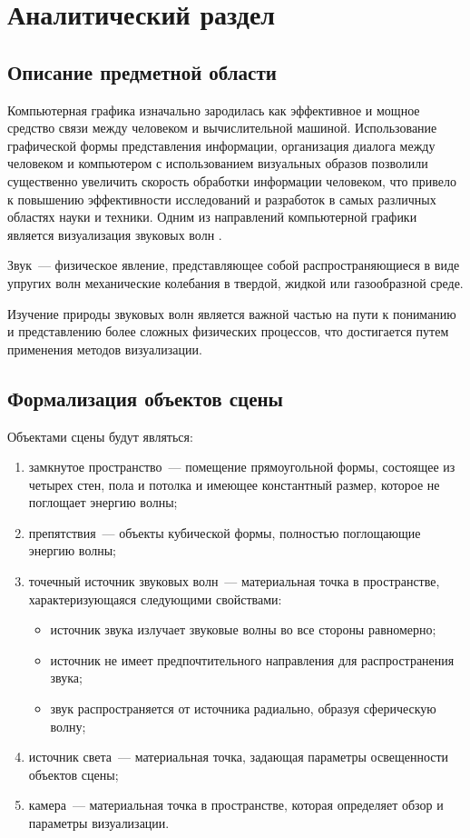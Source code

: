 \chapter{Аналитический раздел}

\section{Описание предметной области}

Компьютерная графика изначально зародилась как эффективное и мощное средство связи между человеком и вычислительной машиной.
Использование графической формы представления информации, организация диалога между человеком и компьютером с использованием визуальных образов позволили существенно увеличить скорость обработки информации человеком, что привело к повышению эффективности исследований и разработок в самых различных областях науки и техники.
Одним из направлений компьютерной графики является визуализация звуковых волн \cite{baseGraph1, baseGraph2}.

Звук~--- физическое явление, представляющее собой распространяющиеся в виде упругих волн механические колебания в твердой, жидкой или газообразной среде.

Изучение природы звуковых волн является важной частью на пути к пониманию и представлению более сложных физических процессов, что достигается путем применения методов визуализации.

\clearpage

\section{Формализация объектов сцены}

Объектами сцены будут являться:
\begin{enumerate}
	\item замкнутое пространство~--- помещение прямоугольной формы, состоящее из четырех стен, пола и потолка и имеющее константный размер, которое не поглощает энергию волны;
	\item препятствия~--- объекты кубической формы, полностью поглощающие энергию волны;
	\item точечный источник звуковых волн~--- материальная точка в пространстве, характеризующаяся следующими свойствами:
	\begin{itemize}
		\item источник звука излучает звуковые волны во все стороны равномерно;
		\item источник не имеет предпочтительного направления для распространения звука;
		\item звук распространяется от источника радиально, образуя сферическую волну;
	\end{itemize}
	\item источник света~--- материальная точка, задающая параметры освещенности объектов сцены;
	\item камера~--- материальная точка в пространстве, которая определяет обзор и параметры визуализации.
\end{enumerate}

